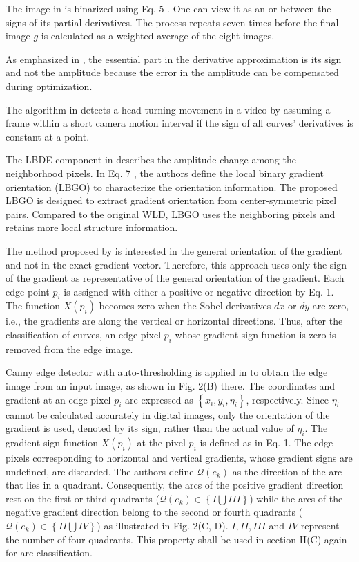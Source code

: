 \documentclass[11pt]{book}
\begin{document}
The image in \cite{kuznetsov2017new} is binarized using Eq. 5 . One
can view it as an \textquotedbl or\textquotedbl{} between the signs
of its partial derivatives. The process repeats seven times before
the final image $g$ is calculated as a weighted average of the eight
images.

As emphasized in \cite{kudryavtsev2017autofocus}, the essential part
in the derivative approximation is its sign and not the amplitude
because the error in the amplitude can be compensated during optimization.

The algorithm in \cite{silva2018weighted} detects a head-turning
movement in a video by assuming a frame within a short camera motion
interval if the sign of all curves' derivatives is constant at a point.

The LBDE component in \cite{xia2018novel} describes the amplitude
change among the neighborhood pixels. In Eq. 7 , the authors define
the local binary gradient orientation (LBGO) to characterize the orientation
information. The proposed LBGO is designed to extract gradient orientation
from center-symmetric pixel pairs. Compared to the original WLD, LBGO
uses the neighboring pixels and retains more local structure information.

The method proposed by \cite{dong2018accurate} is interested in the
general orientation of the gradient and not in the exact gradient
vector. Therefore, this approach uses only the sign of the gradient
as representative of the general orientation of the gradient. Each
edge point $p_{i}$ is assigned with either a positive or negative
direction by Eq. 1. The function $X\left(p_{i}\right)$ becomes zero
when the Sobel derivatives $dx$ or $dy$ are zero, i.e., the gradients
are along the vertical or horizontal directions. Thus, after the classification
of curves, an edge pixel $p_{i}$ whose gradient sign function is
zero is removed from the edge image.

Canny edge detector with auto-thresholding is applied in \cite{dong2018fast}
to obtain the edge image from an input image, as shown in Fig. 2(B)
there. The coordinates and gradient at an edge pixel $p_{i}$ are
expressed as $\left\{ x_{i},y_{i},\eta_{i}\right\} $, respectively.
Since $\eta_{i}$ cannot be calculated accurately in digital images,
only the orientation of the gradient is used, denoted by its sign,
rather than the actual value of $\eta_{i}$. The gradient sign function
$X\left(p_{i}\right)$ at the pixel $p_{i}$ is defined as in Eq.
1. The edge pixels corresponding to horizontal and vertical gradients,
whose gradient signs are undefined, are discarded. The authors define
$\mathscr{Q}\left(e_{k}\right)$ as the direction of the arc that
lies in a quadrant. Consequently, the arcs of the positive gradient
direction rest on the first or third quadrants ($\mathscr{Q}(e_{k})\in\left\{ I\bigcup III\right\} $)
while the arcs of the negative gradient direction belong to the second
or fourth quadrants ($\mathscr{Q}(e_{k})\in\left\{ II\bigcup IV\right\} $)
as illustrated in Fig. 2(C, D). $I,II,III$ and $IV$ represent the
number of four quadrants. This property shall be used in section II(C)
again for arc classification.
\end{document}
